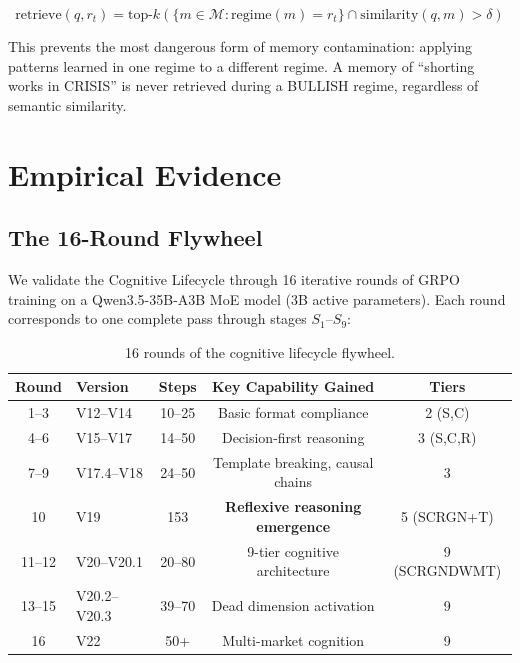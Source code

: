 \documentclass[11pt, a4paper]{article}
\begin{document}
\begin{equation}
  \text{retrieve}(q, r_t) = \text{top-}k\left(\{m \in \mathcal{M} : \text{regime}(m) = r_t\} \cap \text{similarity}(q, m) > \delta\right)
\end{equation}

This prevents the most dangerous form of memory contamination: applying patterns learned in one regime to a different regime. A memory of ``shorting works in CRISIS'' is never retrieved during a BULLISH regime, regardless of semantic similarity.


\section{Empirical Evidence}
\label{sec:empirical}

\subsection{The 16-Round Flywheel}

We validate the Cognitive Lifecycle through 16 iterative rounds of GRPO training on a Qwen3.5-35B-A3B MoE model (3B active parameters). Each round corresponds to one complete pass through stages $S_1$--$S_9$:

\begin{table}[H]
\centering
\small
\begin{tabular}{clccc}
\toprule
\textbf{Round} & \textbf{Version} & \textbf{Steps} & \textbf{Key Capability Gained} & \textbf{Tiers} \\
\midrule
1--3 & V12--V14 & 10--25 & Basic format compliance & 2 (S,C) \\
4--6 & V15--V17 & 14--50 & Decision-first reasoning & 3 (S,C,R) \\
7--9 & V17.4--V18 & 24--50 & Template breaking, causal chains & 3 \\
10 & V19 & 153 & \textbf{Reflexive reasoning emergence} & 5 (SCRGN+T) \\
11--12 & V20--V20.1 & 20--80 & 9-tier cognitive architecture & 9 (SCRGNDWMT) \\
13--15 & V20.2--V20.3 & 39--70 & Dead dimension activation & 9 \\
16 & V22 & 50+ & Multi-market cognition & 9 \\
\bottomrule
\end{tabular}
\caption{16 rounds of the cognitive lifecycle flywheel.}
\end{table}
\end{document}
